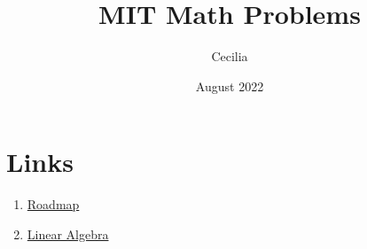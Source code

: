 \documentclass{article}
\title{MIT Math Problems}
\author{Cecilia}
\date{August 2022}
\begin{document}
\maketitle

\section*{Links}
    \begin{enumerate}
        \item \href{https://math.mit.edu/academics/undergrad/roadmaps.php}{Roadmap}
        \item \href{https://ocw.mit.edu/courses/18-700-linear-algebra-fall-2013/}{Linear Algebra}
    \end{enumerate}

%
%





















\end{document}
